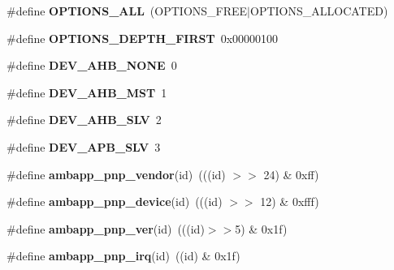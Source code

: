 \begin{DoxyCompactItemize}
\mbox{\label{group__amba_ga184e2f8ef309cb2f63c8a26fc4b40afb}} 
\#define {\bfseries O\+P\+T\+I\+O\+N\+S\+\_\+\+A\+LL}~(O\+P\+T\+I\+O\+N\+S\+\_\+\+F\+R\+EE$\vert$O\+P\+T\+I\+O\+N\+S\+\_\+\+A\+L\+L\+O\+C\+A\+T\+ED)
\item 
\mbox{\label{group__amba_ga72949ad4f50e2305d301dd6747db9836}} 
\#define {\bfseries O\+P\+T\+I\+O\+N\+S\+\_\+\+D\+E\+P\+T\+H\+\_\+\+F\+I\+R\+ST}~0x00000100
\item 
\mbox{\label{group__amba_ga47df7519356cbcf1cf4b2a6c82abaf4b}} 
\#define {\bfseries D\+E\+V\+\_\+\+A\+H\+B\+\_\+\+N\+O\+NE}~0
\item 
\mbox{\label{group__amba_ga83ab4f0e20ecba9dc144604510a18cb4}} 
\#define {\bfseries D\+E\+V\+\_\+\+A\+H\+B\+\_\+\+M\+ST}~1
\item 
\mbox{\label{group__amba_gacabc7d3d0c396ebf59f7a2154dd49d37}} 
\#define {\bfseries D\+E\+V\+\_\+\+A\+H\+B\+\_\+\+S\+LV}~2
\item 
\mbox{\label{group__amba_ga738e0a9651bcbe96732dfac495d123e3}} 
\#define {\bfseries D\+E\+V\+\_\+\+A\+P\+B\+\_\+\+S\+LV}~3
\item 
\mbox{\label{group__amba_gac354202aac648ebf389bcfe127fd150b}} 
\#define {\bfseries ambapp\+\_\+pnp\+\_\+vendor}(id)~(((id) $>$$>$ 24) \& 0xff)
\item 
\mbox{\label{group__amba_gad7466534465821a5a85e1887e20b554d}} 
\#define {\bfseries ambapp\+\_\+pnp\+\_\+device}(id)~(((id) $>$$>$ 12) \& 0xfff)
\item 
\mbox{\label{group__amba_gac807d87ee074c7810b9ae496e8f1e410}} 
\#define {\bfseries ambapp\+\_\+pnp\+\_\+ver}(id)~(((id)$>$$>$5) \& 0x1f)
\item 
\mbox{\label{group__amba_ga56d84bfab9469e2be81bb50ffdb80750}} 
\#define {\bfseries ambapp\+\_\+pnp\+\_\+irq}(id)~((id) \& 0x1f)
\item 
\mbox{\label{group__amba_ga916275f5db159b070885858c7b750eb6}} 
$$
\end{DoxyCompactItemize}

